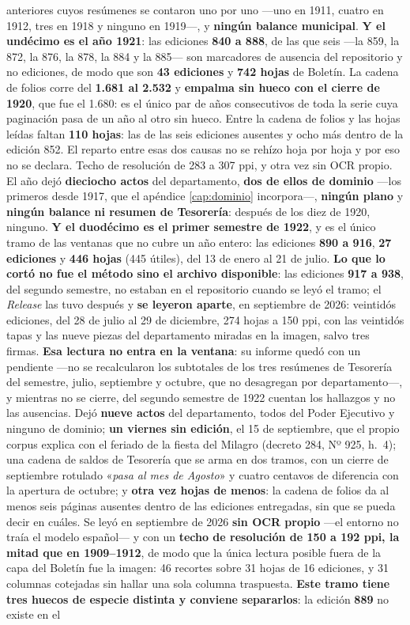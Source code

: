 anteriores cuyos resúmenes se contaron uno por uno ---uno en 1911, cuatro en 1912, tres en 1918 y ninguno en 1919---, y \textbf{ningún balance municipal}. \textbf{Y el undécimo es el año 1921}: las ediciones \textbf{840 a 888}, de las que seis ---la 859, la 872, la 876, la 878, la 884 y la 885--- son marcadores de ausencia del repositorio y no ediciones, de modo que son \textbf{43 ediciones} y \textbf{742 hojas} de Boletín. La cadena de folios corre del \textbf{1.681 al 2.532} y \textbf{empalma sin hueco con el cierre de 1920}, que fue el 1.680: es el único par de años consecutivos de toda la serie cuya paginación pasa de un año al otro sin hueco. Entre la cadena de folios y las hojas leídas faltan \textbf{110 hojas}: las de las seis ediciones ausentes y ocho más dentro de la edición 852. El reparto entre esas dos causas no se rehízo hoja por hoja y por eso no se declara. Techo de resolución de 283 a 307 ppi, y otra vez sin OCR propio. El año dejó \textbf{dieciocho actos} del departamento, \textbf{dos de ellos de dominio} ---los primeros desde 1917, que el apéndice \ref{cap:dominio} incorpora---, \textbf{ningún plano} y \textbf{ningún balance ni resumen de Tesorería}: después de los diez de 1920, ninguno. \textbf{Y el duodécimo es el primer semestre de 1922}, y es el único tramo de las ventanas que no cubre un año entero: las ediciones \textbf{890 a 916}, \textbf{27 ediciones} y \textbf{446 hojas} (445 útiles), del 13 de enero al 21 de julio. \textbf{Lo que lo cortó no fue el método sino el archivo disponible}: las ediciones \textbf{917 a 938}, del segundo semestre, no estaban en el repositorio cuando se leyó el tramo; el \textit{Release} las tuvo después y \textbf{se leyeron aparte}, en septiembre de 2026: veintidós ediciones, del 28 de julio al 29 de diciembre, 274 hojas a 150 ppi, con las veintidós tapas y las nueve piezas del departamento miradas en la imagen, salvo tres firmas. \textbf{Esa lectura no entra en la ventana}: su informe quedó con un pendiente ---no se recalcularon los subtotales de los tres resúmenes de Tesorería del semestre, julio, septiembre y octubre, que no desagregan por departamento---, y mientras no se cierre, del segundo semestre de 1922 cuentan los hallazgos y no las ausencias. Dejó \textbf{nueve actos} del departamento, todos del Poder Ejecutivo y ninguno de dominio; \textbf{un viernes sin edición}, el 15 de septiembre, que el propio corpus explica con el feriado de la fiesta del Milagro (decreto 284, Nº 925, h.\ 4); una cadena de saldos de Tesorería que se arma en dos tramos, con un cierre de septiembre rotulado «\textit{pasa al mes de Agosto}» y cuatro centavos de diferencia con la apertura de octubre; y \textbf{otra vez hojas de menos}: la cadena de folios da al menos seis páginas ausentes dentro de las ediciones entregadas, sin que se pueda decir en cuáles. Se leyó en septiembre de 2026 \textbf{sin OCR propio} ---el entorno no traía el modelo español--- y con un \textbf{techo de resolución de 150 a 192 ppi, la mitad que en 1909--1912}, de modo que la única lectura posible fuera de la capa del Boletín fue la imagen: 46 recortes sobre 31 hojas de 16 ediciones, y 31 columnas cotejadas sin hallar una sola columna traspuesta. \textbf{Este tramo tiene tres huecos de especie distinta y conviene separarlos}: la edición \textbf{889} no existe en el 